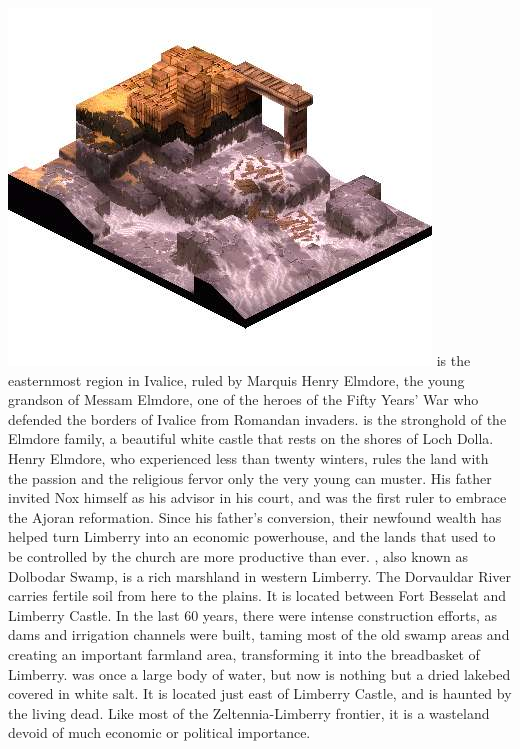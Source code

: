 \includegraphics[width=\columnwidth]{./art/worldbook/poeskas.jpg}
\ofpar
%
 is the easternmost region in Ivalice, ruled by Marquis Henry Elmdore, the young grandson of Messam Elmdore, one of the heroes of the Fifty Years' War who defended the borders of Ivalice from Romandan invaders.
 is the stronghold of the Elmdore family, a beautiful white castle that rests on the shores of Loch Dolla. 
Henry Elmdore, who experienced less than twenty winters, rules the land with the passion and the religious fervor only the very young can muster.
His father invited Nox himself as his advisor in his court, and was the first ruler to embrace the Ajoran reformation.
Since his father's conversion, their newfound wealth has helped turn Limberry into an economic powerhouse, and the lands that used to be controlled by the church are more productive than ever.
, also known as Dolbodar Swamp, is a rich marshland in western Limberry.
The Dorvauldar River carries fertile soil from here to the plains. 
It is located between Fort Besselat and Limberry Castle. 
In the last 60 years, there were intense construction efforts, as dams and irrigation channels were built, taming most of the old swamp areas and creating an important farmland area, transforming it into the breadbasket of Limberry.
 was once a large body of water, but now is nothing but a dried lakebed covered in white salt.
It is located just east of Limberry Castle, and is haunted by the living dead. 
Like most of the Zeltennia-Limberry frontier, it is a wasteland devoid of much economic or political importance. 
